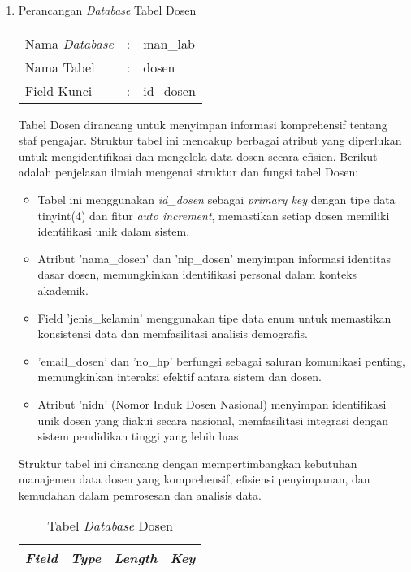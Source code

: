 \begin{enumerate}


	\item Perancangan \textit{Database} Tabel Dosen \\
	      \begin{tabular}{lll}
		      Nama \textit{Database} & : & man\_lab  \\
		      Nama Tabel             & : & dosen     \\
		      Field Kunci            & : & id\_dosen \\
	      \end{tabular}

	      Tabel Dosen dirancang untuk menyimpan informasi komprehensif tentang staf pengajar. Struktur tabel ini mencakup berbagai atribut yang diperlukan untuk mengidentifikasi dan mengelola data dosen secara efisien. Berikut adalah penjelasan ilmiah mengenai struktur dan fungsi tabel Dosen:

	      \begin{itemize}
		      \item Tabel ini menggunakan \textit{id\_dosen} sebagai \textit{primary key} dengan tipe data tinyint(4) dan fitur \textit{auto increment}, memastikan setiap dosen memiliki identifikasi unik dalam sistem.
		      \item Atribut 'nama\_dosen' dan 'nip\_dosen' menyimpan informasi identitas dasar dosen, memungkinkan identifikasi personal dalam konteks akademik.
		      \item Field 'jenis\_kelamin' menggunakan tipe data enum untuk memastikan konsistensi data dan memfasilitasi analisis demografis.
		      \item 'email\_dosen' dan 'no\_hp' berfungsi sebagai saluran komunikasi penting, memungkinkan interaksi efektif antara sistem dan dosen.
		      \item Atribut 'nidn' (Nomor Induk Dosen Nasional) menyimpan identifikasi unik dosen yang diakui secara nasional, memfasilitasi integrasi dengan sistem pendidikan tinggi yang lebih luas.
	      \end{itemize}

	      Struktur tabel ini dirancang dengan mempertimbangkan kebutuhan manajemen data dosen yang komprehensif, efisiensi penyimpanan, dan kemudahan dalam pemrosesan dan analisis data.

		      {
			      \fontsize{10}{12}\selectfont
			      \begin{longtable}{l l l l}
				      \caption{Tabel \textit{\textit{Database}} Dosen}
				      \label{admin}                                                                                                  \\
				      \hline
				      \textbf{\textit{Field}} & \textbf{\textit{Type}} & \textbf{\textit{Length}}   & \textbf{\textit{Key}}          \\
				      \hline
				      \endfirsthead


\end{longtable}}
\end{enumerate}
